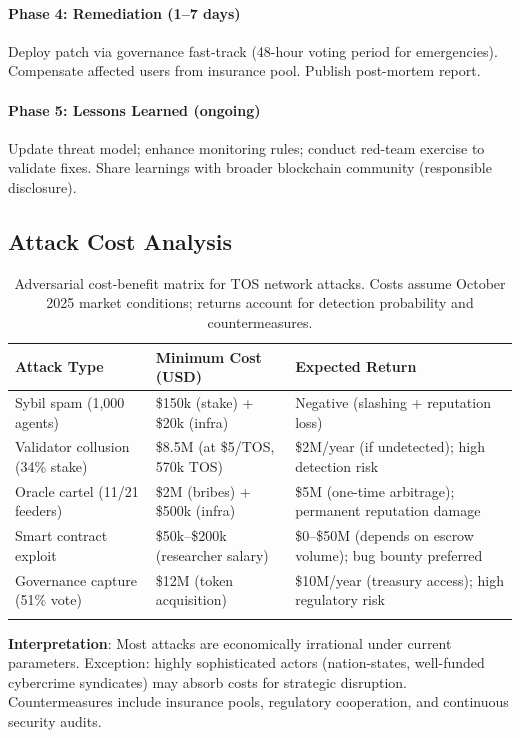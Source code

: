 \documentclass[11pt]{article}
\begin{document}
\paragraph{Phase 4: Remediation (1--7 days)}
Deploy patch via governance fast-track (48-hour voting period for emergencies). Compensate affected users from insurance pool. Publish post-mortem report.

\paragraph{Phase 5: Lessons Learned (ongoing)}
Update threat model; enhance monitoring rules; conduct red-team exercise to validate fixes. Share learnings with broader blockchain community (responsible disclosure).

\subsection{Attack Cost Analysis}

\begin{longtable}{@{}p{}p{}p{}@{}}
\toprule
\textbf{Attack Type} & \textbf{Minimum Cost (USD)} & \textbf{Expected Return} \\\midrule
Sybil spam (1,000 agents) & \$150k (stake) + \$20k (infra) & Negative (slashing + reputation loss) \\
Validator collusion (34\% stake) & \$8.5M (at \$5/TOS, 570k TOS) & \$2M/year (if undetected); high detection risk \\
Oracle cartel (11/21 feeders) & \$2M (bribes) + \$500k (infra) & \$5M (one-time arbitrage); permanent reputation damage \\
Smart contract exploit & \$50k--\$200k (researcher salary) & \$0--\$50M (depends on escrow volume); bug bounty preferred \\
Governance capture (51\% vote) & \$12M (token acquisition) & \$10M/year (treasury access); high regulatory risk \\
\bottomrule
\caption{Adversarial cost-benefit matrix for TOS network attacks. Costs assume October 2025 market conditions; returns account for detection probability and countermeasures.}
\end{longtable}

\textbf{Interpretation}: Most attacks are economically irrational under current parameters. Exception: highly sophisticated actors (nation-states, well-funded cybercrime syndicates) may absorb costs for strategic disruption. Countermeasures include insurance pools, regulatory cooperation, and continuous security audits.
\end{document}
